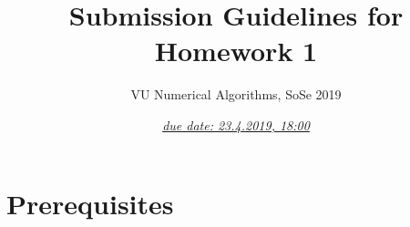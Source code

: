 \documentclass{scrartcl}
\title{Submission Guidelines for Homework 1}
\subtitle{VU Numerical Algorithms, SoSe 2019}
\date{\underline{\emph{due date: 23.4.2019, 18:00}}}
\newenvironment{mymdframed}[1]{%
\mdfsetup{%
frametitle={\colorbox{white}{\,#1\,}},
frametitleaboveskip=-\ht\strutbox,
frametitlealignment=\raggedright
}%
\begin{mdframed}[style=exampledefault]
}{\end{mdframed}}
\begin{document}
\maketitle

\section*{Prerequisites}
\end{document}
